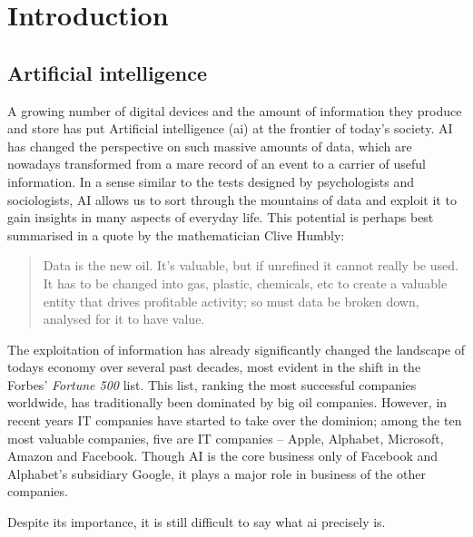 \chapter{Introduction}\label{ch:introduction}


\section{Artificial intelligence}


A growing number of digital devices and the amount of information they produce and store has put Artificial intelligence (\gls{ai}) at the frontier of today's society.
AI has changed the perspective on such massive amounts of data, which are nowadays transformed from a mare record of an event to a carrier of useful information.
In a sense similar to the tests designed by psychologists and sociologists, AI allows us to sort through the mountains of data and exploit it to gain insights in many aspects of everyday life.
This potential is perhaps best summarised in a quote by the mathematician Clive Humbly:
\begin{quote}
	Data is the new oil. It’s valuable, but if unrefined it cannot really be used. It has to be changed into gas, plastic, chemicals, etc to create a valuable entity that drives profitable activity; so must data be broken down, analysed for it to have value.
\end{quote}
The exploitation of information has already significantly changed the landscape of todays economy over several past decades, most evident in the shift in the Forbes' \textit{Fortune 500} list.
This list, ranking the most successful companies worldwide, has traditionally been dominated by big oil companies.
However, in recent years IT companies have started to take over the dominion; among the ten most valuable companies, five are IT companies -- Apple, Alphabet, Microsoft, Amazon and Facebook.
Though AI is the core business only of Facebook and Alphabet's subsidiary Google, it plays a major role in business of the other companies.



Despite its importance, it is still difficult to say what \gls{ai} precisely is.




